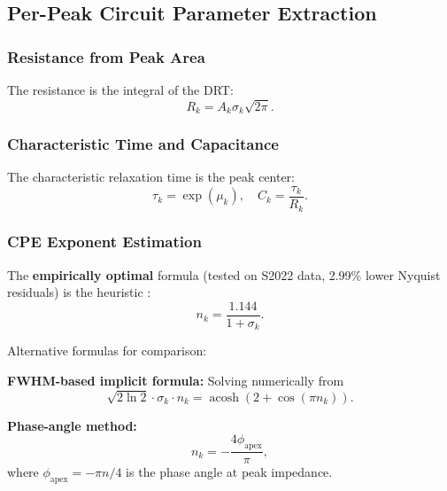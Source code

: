 \documentclass[11pt]{article}
\begin{document}
\subsection{Per-Peak Circuit Parameter Extraction}

\subsubsection{Resistance from Peak Area}

The resistance is the integral of the DRT:
\begin{equation}
R_k = A_k \sigma_k \sqrt{2\pi}.
\end{equation}

\subsubsection{Characteristic Time and Capacitance}

The characteristic relaxation time is the peak center:
\begin{equation}
\tau_k = \exp(\mu_k), \quad C_k = \frac{\tau_k}{R_k}.
\end{equation}

\subsubsection{CPE Exponent Estimation}

The \textbf{empirically optimal} formula (tested on S2022 data, 2.99\% lower Nyquist residuals) is the heuristic \cite{danzer2019,schluter2019,maradesa2023}:
\begin{equation}
n_k = \frac{1.144}{1 + \sigma_k}.
\end{equation}

Alternative formulas for comparison:

\textbf{FWHM-based implicit formula:} Solving numerically from
\begin{equation}
\sqrt{2\ln 2} \cdot \sigma_k \cdot n_k = \operatorname{acosh}(2 + \cos(\pi n_k)).
\end{equation}

\textbf{Phase-angle method:}
\begin{equation}
n_k = -\frac{4\phi_{\text{apex}}}{\pi},
\end{equation}
where $\phi_{\text{apex}} = -\pi n / 4$ is the phase angle at peak impedance.
\end{document}
